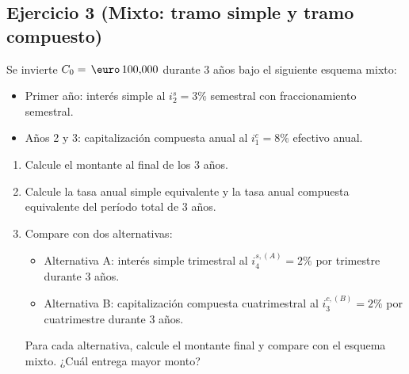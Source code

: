 \documentclass[12pt,a4paper]{article}
\newenvironment{ejercicio}[1]{\subsection*{Ejercicio #1}}{}
\begin{document}
\begin{ejercicio}{3 (Mixto: tramo simple y tramo compuesto)}
Se invierte $C_0=\,\text{\euro}\,100{,}000$ durante $3$ años bajo el siguiente esquema mixto:
\begin{itemize}
  \item Primer año: interés simple al $i_2^s=3\%$ semestral con fraccionamiento semestral.
  \item Años 2 y 3: capitalización compuesta anual al $i_1^c=8\%$ efectivo anual.
\end{itemize}
\begin{enumerate}[label=\alph*)]
  \item Calcule el montante al final de los $3$ años.
  \item Calcule la tasa anual simple equivalente y la tasa anual compuesta equivalente del período total de $3$ años.
  \item Compare con dos alternativas:
  \begin{itemize}
    \item Alternativa A: interés simple trimestral al $i_4^{s,(A)}=2\%$ por trimestre durante $3$ años.
    \item Alternativa B: capitalización compuesta cuatrimestral al $i_3^{c,(B)}=2\%$ por cuatrimestre durante $3$ años.
  \end{itemize}
  Para cada alternativa, calcule el montante final y compare con el esquema mixto. ¿Cuál entrega mayor monto?
\end{enumerate}
\end{ejercicio}
\end{document}
